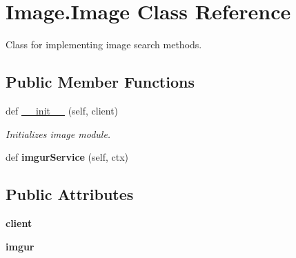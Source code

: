 \hypertarget{class_image_1_1_image}{}\section{Image.\+Image Class Reference}
\label{class_image_1_1_image}


Class for implementing image search methods.  


\subsection*{Public Member Functions}
\begin{DoxyCompactItemize}
\item 
\mbox{\label{class_image_1_1_image_a008beb6a3d3c43969d0e38987a43ae11}} 
def \mbox{\hyperlink{class_image_1_1_image_a008beb6a3d3c43969d0e38987a43ae11}{\+\_\+\+\_\+init\+\_\+\+\_\+}} (self, client)
\begin{DoxyCompactList}\small\item\em Initializes image module. \end{DoxyCompactList}\item 
\mbox{\label{class_image_1_1_image_af25d7ddd744380379e5f1736e89e495b}} 
def {\bfseries imgur\+Service} (self, ctx)
\end{DoxyCompactItemize}
\subsection*{Public Attributes}
\begin{DoxyCompactItemize}
\item 
\mbox{\label{class_image_1_1_image_ae3f5f6f36424d370d7a4d7c29175c299}} 
{\bfseries client}
\item 
\mbox{\label{class_image_1_1_image_ac95a48dfab0f7623775d9a088665c6ce}} 
{\bfseries imgur}
\end{DoxyCompactItemize}
